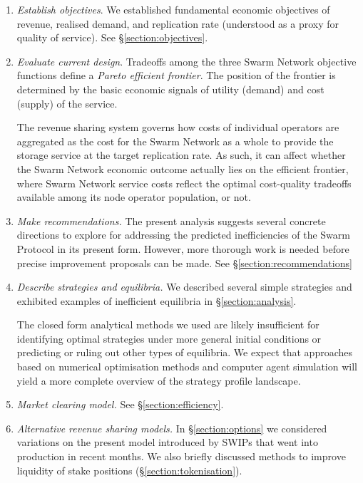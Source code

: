 \begin{enumerate}
  \item 
    \emph{Establish objectives}. 
    We established fundamental economic objectives of revenue, realised demand, and replication rate (understood as a proxy for quality of service). 
    See \S\ref{section:objectives}.

  \item 
    \emph{Evaluate current design}. 
    Tradeoffs among the three Swarm Network objective functions define a \emph{Pareto efficient frontier}.
    The position of the frontier is determined by the basic economic signals of utility (demand) and cost (supply) of the service.
    
    The revenue sharing system governs how costs of individual operators are aggregated as the cost for the Swarm Network as a whole to provide the storage service at the target replication rate.
    As such, it can affect whether the Swarm Network economic outcome actually lies on the efficient frontier, where Swarm Network service costs reflect the optimal cost-quality tradeoffs available among its node operator population, or not.

  \item 
    \emph{Make recommendations.} 
    The present analysis suggests several concrete directions to explore for addressing the predicted inefficiencies of the Swarm Protocol in its present form.
    However, more thorough work is needed before precise improvement proposals can be made.
    See \S\ref{section:recommendations}

  \item 
    \emph{Describe strategies and equilibria.} 
    We described several simple strategies and exhibited examples of inefficient equilibria in \S\ref{section:analysis}.
    
    The closed form analytical methods we used are likely insufficient for identifying optimal strategies under more general initial conditions or predicting or ruling out other types of equilibria.
    We expect that approaches based on numerical optimisation methods and computer agent simulation will yield a more complete overview of the strategy profile landscape.
  
  \item 
    \emph{Market clearing model.} See \S\ref{section:efficiency}.
    
  \item 
    \emph{Alternative revenue sharing models.} 
    In \S\ref{section:options} we considered variations on the present model introduced by SWIPs that went into production in recent months.
    We also briefly discussed methods to improve liquidity of stake positions (\S\ref{section:tokenisation}).

\end{enumerate}




